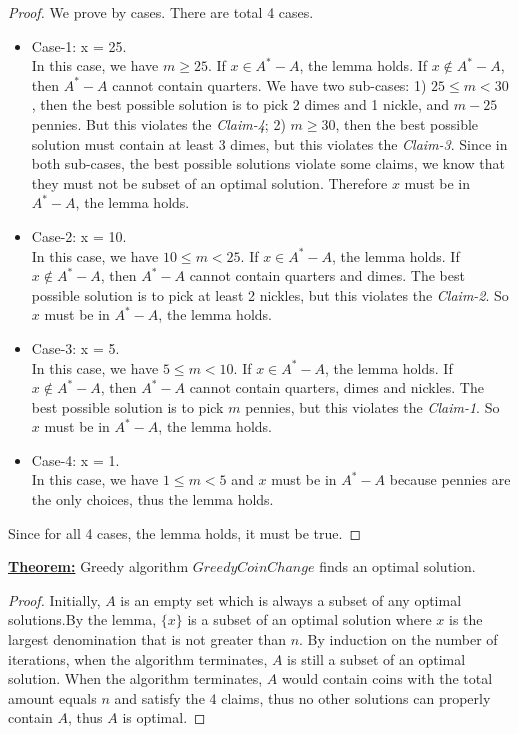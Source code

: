\documentclass[11pt]{article}
\begin{document}
\begin{enumerate}
\begin{enumerate}
\begin{proof}
  We prove by cases. There are total 4 cases.
\begin{itemize}
\item Case-1: x = 25.\\
  In this case, we have $m \geq 25$. If $x \in A^*-A$, the lemma
  holds. If $x \notin A^*-A$, then $A^*-A$ cannot contain quarters. We
  have two sub-cases: 1) $25 \leq m < 30$, then the best possible solution is to
  pick 2 dimes and 1 nickle, and $m-25$ pennies. But this violates the
  \emph{Claim-4}; 2) $m \geq 30$, then the best possible solution must contain at
  least 3 dimes, but this violates the \emph{Claim-3}. Since in both
  sub-cases, the best possible solutions violate some claims, we know
  that they must not be subset of an optimal solution. Therefore $x$
  must be in $A^*-A$, the lemma holds.
\item Case-2: x = 10.\\
  In this case, we have $10 \leq m < 25$. If $x \in A^*-A$, the lemma
  holds. If $x \notin A^*-A$, then $A^*-A$ cannot contain quarters and
  dimes. The best possible solution is to pick at least 2 nickles, but
  this violates the \emph{Claim-2}. So $x$ must be in $A^*-A$, the
  lemma holds. 
\item Case-3: x = 5.\\
  In this case, we have $5 \leq m < 10$. If $x \in A^*-A$, the lemma
  holds. If $x \notin A^*-A$, then $A^*-A$ cannot contain quarters,
  dimes and nickles. The best possible solution is to pick $m$
  pennies, but this violates the \emph{Claim-1}. So $x$ must be in
  $A^*-A$, the lemma holds.
\item Case-4: x = 1.\\
  In this case, we have $1 \leq m < 5$ and $x$ must be in
  $A^*-A$ because pennies are the only choices, thus the lemma holds.
\end{itemize}
Since for all 4 cases, the lemma holds, it must be true.
\end{proof}

\underline{\textbf{Theorem:}} Greedy algorithm $GreedyCoinChange$
finds an optimal solution.

\begin{proof}
  Initially, $A$ is an empty set which is always a subset of any
  optimal solutions.By the lemma, $\{x\}$ is a subset of an optimal
  solution where $x$ is the largest denomination that is not greater
  than $n$. By induction on the number of iterations, when 
  the algorithm terminates, $A$ is still a subset of an optimal
  solution. When the algorithm terminates, $A$ would contain coins
  with the total amount equals $n$ and satisfy the 4 claims, thus no
  other solutions can properly contain $A$, thus $A$ is optimal.
\end{proof}


\end{enumerate}
\end{enumerate}
\end{document}
